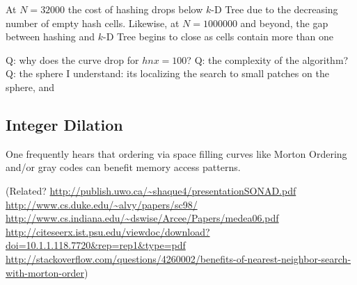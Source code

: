 \documentclass{report}
\begin{document}
At $N=32000$ the cost of hashing drops below $k$-D Tree due to the decreasing number of empty hash cells. Likewise, at $N=1000000$ and beyond, the gap between hashing and $k$-D Tree begins to close as cells contain more than one 


Q: why does the curve drop for $hnx=100$? 
Q: the complexity of the algorithm? 
Q: the sphere I understand: its localizing the search to small patches on the sphere, and 


\subsection{Integer Dilation}
One frequently hears that ordering via space filling curves like Morton Ordering and/or gray codes can benefit memory access patterns. 

(Related? \url{http://publish.uwo.ca/~shaque4/presentationSONAD.pdf} \url{http://www.cs.duke.edu/~alvy/papers/sc98/} \url{http://www.cs.indiana.edu/~dswise/Arcee/Papers/medea06.pdf} \url{http://citeseerx.ist.psu.edu/viewdoc/download?doi=10.1.1.118.7720&rep=rep1&type=pdf} \url{http://stackoverflow.com/questions/4260002/benefits-of-nearest-neighbor-search-with-morton-order})
\end{document}
